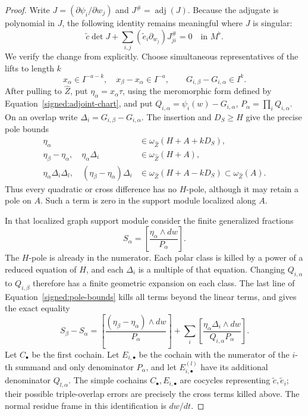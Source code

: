 \begin{proof}
Write \(J=(\partial\psi_i/\partial w_j)\) and
\(J^\#=\operatorname{adj}(J)\).  Because the adjugate is polynomial in
\(J\), the following identity remains meaningful where \(J\) is singular:
\begin{equation}\label{signed:adjugate}
 \widetilde c\det J+
 \sum_{i,j}(\widetilde e_i\partial_{w_j})J^\#_{ji}=0
 \quad\text{in }M^\flat.
\end{equation}
We verify the change from \cite[Lemma~12.2]{BL} explicitly.
Choose simultaneous representatives of the lifts to length \(k\)
\[
 x_\alpha\in I^{-a-k},\quad x_\beta-x_\alpha\in I^{-a},
 \qquad G_{i,\beta}-G_{i,\alpha}\in I^k.
\]
After pulling to \(\widehat Z\), put
\(\eta_\alpha=x_\alpha\tau\), using the meromorphic form
defined by Equation~\eqref{signed:adjoint-chart}, and put
\(Q_{i,\alpha}=\psi_i(w)-G_{i,\alpha}\),
\(P_\alpha=\prod_iQ_{i,\alpha}\).  On an overlap write
\(\Delta_i=G_{i,\beta}-G_{i,\alpha}\).  The insertion and
\(D_S\geq H\) give the precise pole bounds
\begin{align}
 \eta_\alpha&\in\omega_{\widehat Z}(H+A+kD_S),\nonumber\\
 \eta_\beta-\eta_\alpha,\quad \eta_\alpha\Delta_i
   &\in\omega_{\widehat Z}(H+A),\label{signed:pole-bounds}\\
 \eta_\alpha\Delta_i\Delta_l,\quad
 (\eta_\beta-\eta_\alpha)\Delta_i
   &\in\omega_{\widehat Z}(H+A-kD_S)
     \subset\omega_{\widehat Z}(A).\nonumber
\end{align}
Thus every quadratic or cross difference has no \(H\)-pole,
although it may retain a pole on \(A\).  Such a term is zero
in the support module localized along \(A\).

In that localized graph support module consider the finite
generalized fractions
\[
 S_\alpha=\left[\frac{\eta_\alpha\wedge dw}{P_\alpha}\right].
\]
The \(H\)-pole is already in the numerator.  Each polar class
is killed by a power of a reduced equation of \(H\), and each
\(\Delta_i\) is a multiple of that equation.
Changing \(Q_{i,\alpha}\) to \(Q_{i,\beta}\) therefore has a
finite geometric expansion on each class.  The last line of
Equation~\eqref{signed:pole-bounds} kills all terms beyond the
linear terms, and gives the exact equality
\[
 S_\beta-S_\alpha=
 \left[\frac{(\eta_\beta-\eta_\alpha)\wedge dw}{P_\alpha}\right]
 +\sum_i\left[
 \frac{\eta_\alpha\Delta_i\wedge dw}
 {Q_{i,\alpha}P_\alpha}\right].
\]
Let \(C_\bullet\) be the first cochain.  Let \(E_{i,\bullet}\)
be the cochain with the numerator of the \(i\)-th summand and
only denominator \(P_\alpha\), and let \(E_{i,\bullet}^{(l)}\)
have its additional denominator \(Q_{l,\alpha}\).  The simple
cochains \(C_\bullet,E_{i,\bullet}\) are cocycles representing
\(\widetilde c,\widetilde e_i\); their possible triple-overlap
errors are precisely the cross terms killed above.  The normal
residue frame in this identification is \(dw/dt\).


\end{proof}
